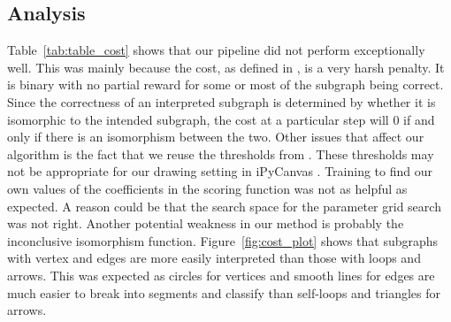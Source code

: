 \subsection{Analysis}

Table~\ref{tab:table_cost} shows that our pipeline did not perform exceptionally well. This was mainly because the cost, as defined in \cite{daly2015hand}, is a very harsh penalty. It is binary with no partial reward for some or most of the subgraph being correct. Since the correctness of an interpreted subgraph is determined by whether it is isomorphic to the intended subgraph, the cost at a particular step will 0 if and only if there is an isomorphism between the two. Other issues that affect our algorithm is the fact that we reuse the thresholds from \cite{daly2015hand}. These thresholds may not be appropriate for our drawing setting in iPyCanvas \cite{ipycanvas}. Training to find our own values of the coefficients in the scoring function was not as helpful as expected. A reason could be that the search space for the parameter grid search was not right. Another potential weakness in our method is probably the inconclusive isomorphism function. Figure~\ref{fig:cost_plot} shows that subgraphs with vertex and edges are more easily interpreted than those with loops and arrows. This was expected as circles for vertices and smooth lines for edges are much easier to break into segments and classify than self-loops and triangles for arrows.